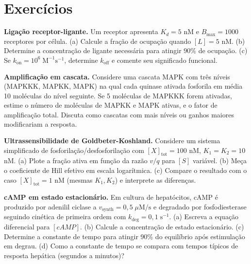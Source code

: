 \section{Exercícios}
\label{sec:09-exercicios}

\begin{exercicio}
\textbf{Ligação receptor-ligante.} Um receptor apresenta $K_d = 5$ nM e
$B_{\max} = 1000$ receptores por célula. (a) Calcule a fração de ocupação
quando $[L] = 5$ nM. (b) Determine a concentração de ligante necessária para
atingir 90\% de ocupação. (c) Se $k_{\mathrm{on}} = 10^6\;\mathrm{M}^{-1}\mathrm{s}^{-1}$,
determine $k_{\mathrm{off}}$ e comente seu significado funcional.
\end{exercicio}

\begin{exercicio}
\textbf{Amplificação em cascata.} Considere uma cascata MAPK com três níveis
(MAPKKK, MAPKK, MAPK) na qual cada quinase ativada fosforila em média 10
moléculas do nível seguinte. Se 5 moléculas de MAPKKK forem ativadas, estime
o número de moléculas de MAPKK e MAPK ativas, e o fator de amplificação total.
Discuta como cascatas com mais níveis ou ganhos maiores modificariam a resposta.
\end{exercicio}

\begin{exercicio}
\textbf{Ultrassensibilidade de Goldbeter-Koshland.} Considere um sistema
simplificado de fosforilação/desfosforilação com $[X]_{\mathrm{tot}} = 100$ nM,
$K_1 = K_2 = 10$ nM. (a) Plote a fração ativa em função da razão $v/q$
para $[S]$ variável. (b) Meça o coeficiente de Hill efetivo em escala
logarítmica. (c) Compare o resultado com o caso $[X]_{\mathrm{tot}} = 1$ nM
(mesmas $K_1, K_2$) e interprete as diferenças.
\end{exercicio}

\begin{exercicio}
\textbf{cAMP em estado estacionário.} Em cultura de hepatócitos, cAMP é
produzido por adenilil ciclase a $v_{\mathrm{synth}} = 0{,}5\;\mu\mathrm{M/s}$
e degradado por fosfodiesterase seguindo cinética de primeira ordem com
$k_{\mathrm{deg}} = 0{,}1\;\mathrm{s}^{-1}$. (a) Escreva a equação
diferencial para $[cAMP]$. (b) Calcule a concentração de estado
estacionário. (c) Determine a constante de tempo para atingir 90\% do
equilíbrio após estimulação em degrau. (d) Como a constante de tempo se
compara com tempos típicos de resposta hepática (segundos a minutos)?
\end{exercicio}

